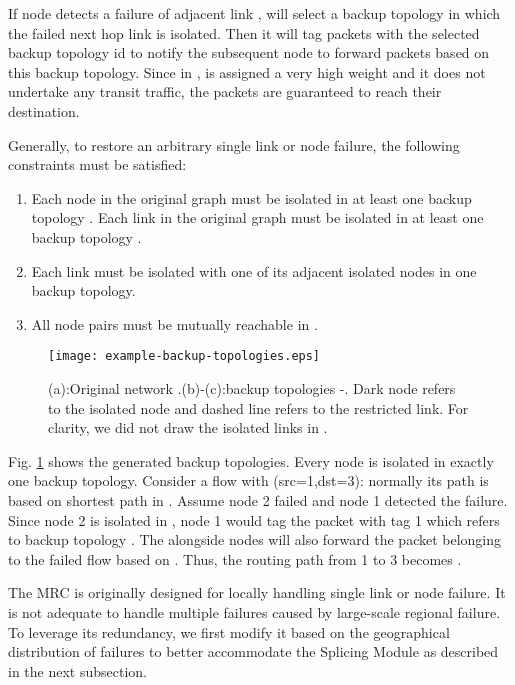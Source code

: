 \documentclass[10pt,journal]{IEEEtran}
\begin{document}
If node  detects a failure of adjacent link ,  will select a backup topology  in which the failed next hop link  is isolated. Then it will tag packets with the selected backup topology id  to notify the subsequent node to forward packets based on this backup topology. Since in ,   is assigned a very high weight and it does not undertake any transit traffic, the packets are guaranteed to reach their destination.

Generally, to restore an arbitrary single link or node failure, the following constraints must be satisfied:

\begin{enumerate}\item[(1)] Each node  in the original graph must be isolated in at least one backup topology . Each link  in the original graph must be isolated in at least one backup topology .
\item[(2)] Each link must be isolated with one of its adjacent isolated nodes in one backup topology.
\item[(3)] All node pairs must be mutually reachable in .
\end{enumerate}

\begin{figure}[!h]
\begin{center}
		\texttt{[image: example-backup-topologies.eps]}
	\caption{(a):Original network .(b)-(c):backup topologies -. Dark node refers to the isolated node and dashed line refers to the restricted link. For clarity, we did not draw the isolated links in .}
	\label{fig:example_backup_topologies}
\end{center}
\end{figure}

Fig. \ref{fig:example_backup_topologies} shows the generated backup topologies. Every node is isolated in exactly one backup topology. Consider a flow with (src=1,dst=3): normally its path is  based on shortest path in . Assume node 2 failed and node 1 detected the failure. Since node 2 is isolated in , node 1 would tag the packet with tag 1 which refers to backup topology . The alongside nodes will also forward the packet belonging to the failed flow based on . Thus, the routing path from 1 to 3 becomes .

The MRC is originally designed for locally handling single link or node failure. It is not adequate to handle multiple failures caused by large-scale regional failure. To leverage its redundancy, we first modify it based on the geographical distribution of failures to better accommodate the Splicing Module as described in the next subsection.
\end{document}
